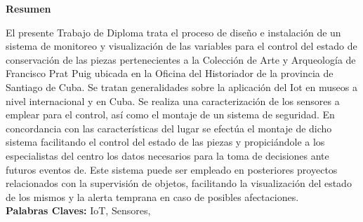 \setcounter{page}{4}
\thispagestyle{plain}

    \textbf{\LARGE Resumen}
\newline

El presente Trabajo de Diploma trata el proceso de diseño e instalación de un sistema de monitoreo y visualización de las variables para el control del estado de conservación de las piezas pertenecientes a la Colección de Arte y Arqueología de Francisco Prat Puig ubicada en la Oficina del Historiador de la provincia de Santiago de Cuba. Se tratan generalidades sobre la aplicación del Iot en museos a nivel internacional y en Cuba. Se realiza una caracterización de los sensores a emplear para el control, así como el montaje de un sistema de seguridad.
En concordancia con las características del lugar se efectúa el montaje de dicho sistema facilitando el control del estado de las piezas y propiciándole a los especialistas del centro los datos necesarios para la toma de decisiones ante futuros eventos de. Este sistema puede ser empleado en posteriores proyectos relacionados con la supervisión de objetos, facilitando la visualización del estado de los mismos y la alerta temprana en caso de posibles afectaciones.\\

\textbf{Palabras Claves: } IoT, Sensores, 